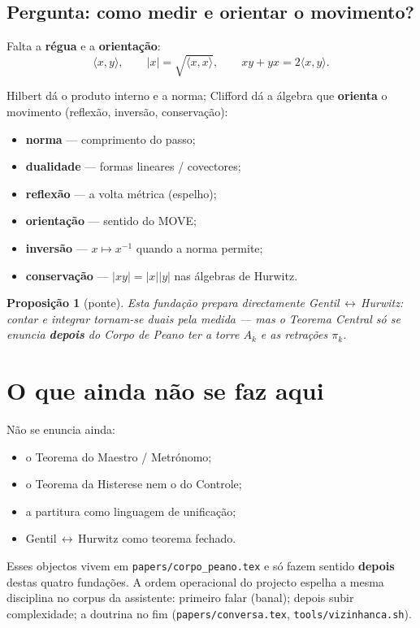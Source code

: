 \documentclass[11pt,a4paper]{article}
\newtheorem{proposicao}{Proposição}
\newcommand{\code}[1]{\texttt{\small #1}}
\begin{document}
\subsection*{Pergunta: como medir e orientar o movimento?}

Falta a \textbf{régua} e a \textbf{orientação}:
\[
\boxed{
\langle x,y\rangle,\qquad
|x|=\sqrt{\langle x,x\rangle},\qquad
xy+yx=2\langle x,y\rangle.
}
\]

\noindent Hilbert dá o produto interno e a norma; Clifford dá a álgebra
que \textbf{orienta} o movimento (reflexão, inversão, conservação):
\begin{itemize}
\item \textbf{norma} --- comprimento do passo;
\item \textbf{dualidade} --- formas lineares / covectores;
\item \textbf{reflexão} --- a volta métrica (espelho);
\item \textbf{orientação} --- sentido do MOVE;
\item \textbf{inversão} --- $x\mapsto x^{-1}$ quando a norma permite;
\item \textbf{conservação} --- $|xy|=|x||y|$ nas álgebras de Hurwitz.
\end{itemize}

\begin{proposicao}[ponte]
Esta fundação prepara directamente Gentil\,$\leftrightarrow$\,Hurwitz:
contar e integrar tornam-se duais \emph{pela medida} --- mas o Teorema
Central só se enuncia \textbf{depois} do Corpo de Peano ter a torre
$A_k$ e as retrações $\pi_k$.
\end{proposicao}

\section{O que ainda não se faz aqui}\label{sec:fund-nao}

Não se enuncia ainda:
\begin{itemize}
\item o Teorema do Maestro / Metrónomo;
\item o Teorema da Histerese nem o do Controle;
\item a partitura como linguagem de unificação;
\item Gentil\,$\leftrightarrow$\,Hurwitz como teorema fechado.
\end{itemize}
Esses objectos vivem em \code{papers/corpo\_peano.tex} e só fazem
sentido \textbf{depois} destas quatro fundações. A ordem operacional
do projecto espelha a mesma disciplina no corpus da assistente:
primeiro falar (banal); depois subir complexidade; a doutrina no fim
(\code{papers/conversa.tex}, \code{tools/vizinhanca.sh}).
\end{document}
